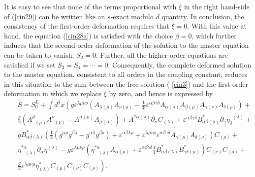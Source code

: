 \documentclass[a4paper,12pt]{article}
\begin{document}
It is easy to see that none of the terms proportional with $\xi $ in the
right hand-side of (\ref{cin29}) can be written like an $s$-exact modulo $d$
quantity. In conclusion, the consistency of the first-order deformation
requires that $\xi =0$. With this value at hand, the equation (\ref{cin28a})
is satisfied with the choice $\beta =0$, which further induces that the
second-order deformation of the solution to the master equation can be taken
to vanish, $S_{2}=0$. Further, all the higher-order equations are satisfied
if we set $S_{3}=S_{4}=\cdots =0$. Consequently, the complete deformed
solution to the master equation, consistent to all orders in the coupling
constant, reduces in this situation to the sum between the free solution (%
\ref{cin3}) and the first-order deformation in which we replace
$\xi $ by zero, and hence is expressed by
\begin{eqnarray}
&&\bar{S}=S_{0}^{L}+\int d^{4}x\left( g\varepsilon ^{\lambda \mu
\nu \rho }\left( A_{\lambda (\mu )}A_{\nu (\rho
)}-\frac{1}{3!}\varepsilon ^{\alpha \beta \gamma \delta }A_{\alpha
(\lambda )}A_{\beta (\mu )}A_{\gamma (\nu )}A_{\delta (\rho
)}\right) +\right. \nonumber \\
&&\frac{g}{2}\left( A_{\;\;(\mu )}^{\mu }A_{\;\;(\nu )}^{\nu
}-A^{\alpha (\mu )}A_{\mu (\alpha )}\right) +A^{*\alpha (\lambda
)}\partial _{\alpha }C_{(\lambda )}+\varepsilon ^{\alpha \beta
\gamma \delta }B_{\alpha \beta (\lambda )}^{*}\partial _{\gamma
}\eta _{\delta }^{\;\;(\lambda )}+ \nonumber \\
&&gB_{\alpha \beta (\lambda )}^{*}\left( \frac{1}{2}\left(
g^{\alpha \rho }g^{\beta \lambda }-g^{\alpha \lambda }g^{\beta
\rho }\right) +\varepsilon ^{\alpha \beta \lambda \rho
}+\varepsilon ^{\lambda \mu \nu \rho }\varepsilon ^{\alpha \beta
\gamma \delta }A_{\gamma (\mu )}A_{\delta (\nu )}\right) C_{(\rho
)}+ \nonumber \\
&&\eta _{\;\;\;(\lambda )}^{*\alpha }\partial _{\alpha }\eta
^{(\lambda )}-g\varepsilon ^{\lambda \mu \nu \rho }\left( \eta
_{\;\;\;(\lambda
)}^{*\alpha }A_{\alpha (\mu )}+\varepsilon ^{\alpha \beta \gamma \delta }%
\frac{1}{4}B_{\alpha \beta (\lambda )}^{*}B_{\gamma \delta (\mu
)}^{*}\right) C_{(\nu )}C_{(\rho )}+ \nonumber \\
&&\left. \frac{g}{3}\varepsilon ^{\lambda \mu \nu \rho }\eta
_{(\lambda )}^{*}C_{(\mu )}C_{(\nu )}C_{(\rho )}\right) .
\label{cindef}
\end{eqnarray}
\end{document}

